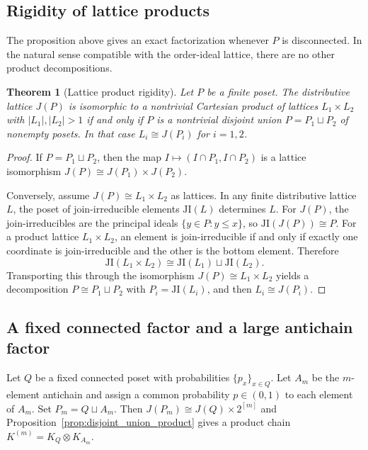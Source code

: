 \documentclass[final,3p,times]{elsarticle}
\newtheorem{theorem}{Theorem}[section]
\theoremstyle{definition}
\begin{document}
\subsection{Rigidity of lattice products}

The proposition above gives an exact factorization whenever $P$ is disconnected.
In the natural sense compatible with the order-ideal lattice, there are no other product decompositions.

\begin{theorem}[Lattice product rigidity]\label{thm:lattice_product_rigidity}
Let $P$ be a finite poset.
The distributive lattice $J(P)$ is isomorphic to a nontrivial Cartesian product of lattices $L_1\times L_2$ with $|L_1|,|L_2|>1$ if and only if $P$ is a nontrivial disjoint union $P=P_1\sqcup P_2$ of nonempty posets.
In that case $L_i\cong J(P_i)$ for $i=1,2$.
\end{theorem}

\begin{proof}
If $P=P_1\sqcup P_2$, then the map $I\mapsto (I\cap P_1, I\cap P_2)$ is a lattice isomorphism $J(P)\cong J(P_1)\times J(P_2)$.

Conversely, assume $J(P)\cong L_1\times L_2$ as lattices.
In any finite distributive lattice $L$, the poset of join-irreducible elements $\mathrm{JI}(L)$ determines $L$.
For $J(P)$, the join-irreducibles are the principal ideals $\{y\in P: y\le x\}$, so $\mathrm{JI}(J(P))\cong P$.
For a product lattice $L_1\times L_2$, an element is join-irreducible if and only if exactly one coordinate is join-irreducible and the other is the bottom element.
Therefore
\[
\mathrm{JI}(L_1\times L_2)\cong \mathrm{JI}(L_1)\sqcup \mathrm{JI}(L_2).
\]
Transporting this through the isomorphism $J(P)\cong L_1\times L_2$ yields a decomposition $P\cong P_1\sqcup P_2$ with $P_i=\mathrm{JI}(L_i)$, and then $L_i\cong J(P_i)$.
\end{proof}

\subsection{A fixed connected factor and a large antichain factor}

Let $Q$ be a fixed connected poset with probabilities $\{p_x\}_{x\in Q}$.
Let $A_m$ be the $m$-element antichain and assign a common probability $p\in(0,1)$ to each element of $A_m$.
Set $P_m = Q\sqcup A_m$.
Then $J(P_m)\cong J(Q)\times 2^{[m]}$ and Proposition~\ref{prop:disjoint_union_product} gives a product chain $K^{(m)} = K_Q\otimes K_{A_m}$.
\end{document}
